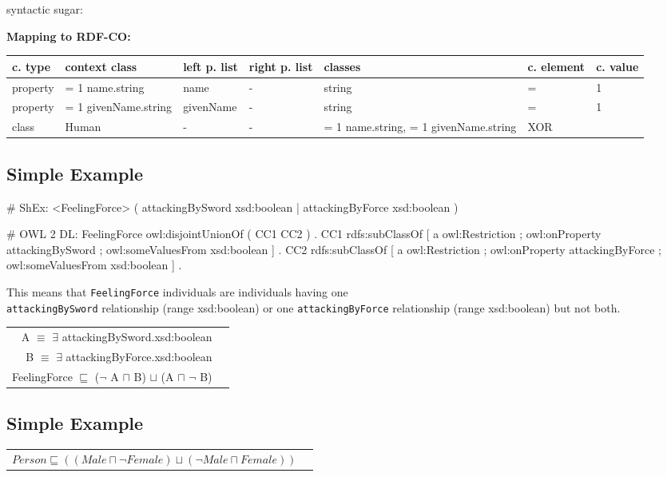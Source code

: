 \documentclass{llncs}
\newcommand{\ms}[1]{\texttt{#1}}
\newenvironment{gcotable}{
  \scriptsize
  \sffamily
  \vspace{0cm}
	\begin{center}
	\textbf{\vspace{0.4cm}Mapping to RDF-CO:} \\
  \begin{tabular}{l|l|l|l|l|l|l}
	\hline
  \textbf{c. type} & \textbf{context class} & \textbf{left p. list} & \textbf{right p. list} & \textbf{classes} & \textbf{c. element} & \textbf{c. value} \\
  \hline

}{
  \hline
  \end{tabular}
	\end{center}
}
\newenvironment{DL}{
  \vspace{0cm}
	\begin{center}
  \begin{tabular}{r l}

}{
  \end{tabular}
	\end{center}
}
\begin{document}
syntactic sugar:
\begin{gcotable}
property & = 1 name.string & name & - & string & = & 1 \\
property & = 1 givenName.string & givenName & - & string & = & 1 \\
class & Human & - & - & = 1 name.string, = 1 givenName.string & XOR \\
\end{gcotable}

\subsection{Simple Example}

\begin{ex}
# ShEx:
<FeelingForce> { (  
    attackingBySword xsd:boolean | 
    attackingByForce xsd:boolean ) }
\end{ex}

\begin{ex}
# OWL 2 DL:
FeelingForce owl:disjointUnionOf ( CC1 CC2 ) . 
CC1 rdfs:subClassOf [
    a owl:Restriction ;
    owl:onProperty attackingBySword ;
    owl:someValuesFrom xsd:boolean ] .
CC2 rdfs:subClassOf [
    a owl:Restriction ;
    owl:onProperty attackingByForce ;
    owl:someValuesFrom xsd:boolean ] .
\end{ex}

This means that \ms{FeelingForce} individuals are individuals having one \\
\ms{attackingBySword} relationship (range xsd:boolean) or one \ms{attackingByForce} relationship (range xsd:boolean) but not both.

\begin{DL}
A $\equiv$ $\exists$ attackingBySword.xsd:boolean \\
B $\equiv$ $\exists$ attackingByForce.xsd:boolean \\ 
FeelingForce $\sqsubseteq$ ($\neg$ A $\sqcap$ B) $\sqcup$ (A $\sqcap$ $\neg$ B) \\
\end{DL}

\subsection{Simple Example}

\begin{DL}
$Person \sqsubseteq ((Male \sqcap \neg Female) \sqcup (\neg Male \sqcap  Female)) $ 
\end{DL}
\end{document}
